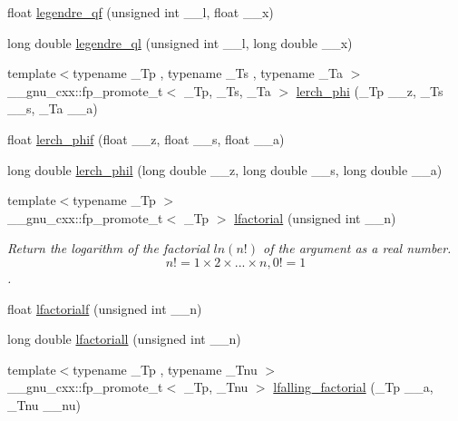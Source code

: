 \begin{DoxyCompactItemize}
\item 
float \hyperlink{group__gnu__math__spec__func_ga46cf4d58886af402c6776bc090b4e4a7}{legendre\+\_\+qf} (unsigned int \+\_\+\+\_\+l, float \+\_\+\+\_\+x)
\item 
long double \hyperlink{group__gnu__math__spec__func_ga60feac5a8bd733abee6610adf15208f2}{legendre\+\_\+ql} (unsigned int \+\_\+\+\_\+l, long double \+\_\+\+\_\+x)
\item 
{\footnotesize template$<$typename \+\_\+\+Tp , typename \+\_\+\+Ts , typename \+\_\+\+Ta $>$ }\\\+\_\+\+\_\+gnu\+\_\+cxx\+::fp\+\_\+promote\+\_\+t$<$ \+\_\+\+Tp, \+\_\+\+Ts, \+\_\+\+Ta $>$ \hyperlink{group__gnu__math__spec__func_ga31d7cfc601a99d72e58f654d0c890fd6}{lerch\+\_\+phi} (\+\_\+\+Tp \+\_\+\+\_\+z, \+\_\+\+Ts \+\_\+\+\_\+s, \+\_\+\+Ta \+\_\+\+\_\+a)
\item 
float \hyperlink{group__gnu__math__spec__func_ga90ae3ca570b08b3f458aa83ec2759be3}{lerch\+\_\+phif} (float \+\_\+\+\_\+z, float \+\_\+\+\_\+s, float \+\_\+\+\_\+a)
\item 
long double \hyperlink{group__gnu__math__spec__func_gab975fa919ede92ec176330809c16c8d5}{lerch\+\_\+phil} (long double \+\_\+\+\_\+z, long double \+\_\+\+\_\+s, long double \+\_\+\+\_\+a)
\item 
{\footnotesize template$<$typename \+\_\+\+Tp $>$ }\\\+\_\+\+\_\+gnu\+\_\+cxx\+::fp\+\_\+promote\+\_\+t$<$ \+\_\+\+Tp $>$ \hyperlink{group__gnu__math__spec__func_gab256f8d7b77b9a8fefafca21827166eb}{lfactorial} (unsigned int \+\_\+\+\_\+n)
\begin{DoxyCompactList}\small\item\em Return the logarithm of the factorial $ ln(n!) $ of the argument as a real number. \[ n! = 1 \times 2 \times ... \times n, 0! = 1 \]. \end{DoxyCompactList}\item 
float \hyperlink{group__gnu__math__spec__func_ga65af05c4093d4895a564a8d67e389a9b}{lfactorialf} (unsigned int \+\_\+\+\_\+n)
\item 
long double \hyperlink{group__gnu__math__spec__func_ga3a0c196f34916dc68c29c89f26cbe1ee}{lfactoriall} (unsigned int \+\_\+\+\_\+n)
\item 
{\footnotesize template$<$typename \+\_\+\+Tp , typename \+\_\+\+Tnu $>$ }\\\+\_\+\+\_\+gnu\+\_\+cxx\+::fp\+\_\+promote\+\_\+t$<$ \+\_\+\+Tp, \+\_\+\+Tnu $>$ \hyperlink{group__gnu__math__spec__func_ga2032c10640d5010666d60d9faec86c32}{lfalling\+\_\+factorial} (\+\_\+\+Tp \+\_\+\+\_\+a, \+\_\+\+Tnu \+\_\+\+\_\+nu)

\end{DoxyCompactItemize}
